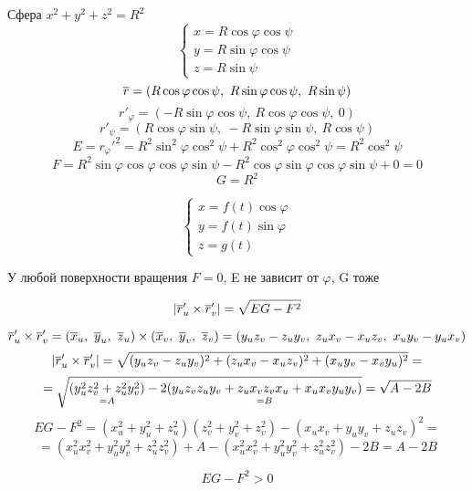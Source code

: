 \documentclass[main]{subfiles}
\begin{document}

	\begin{example}
		Сфера $x^2 + y^2 + z^2 = R^2$
		\[\begin{cases}
		  x = R \cos\varphi \cos\psi\\
		  y = R \sin\varphi \cos\psi\\
		  z = R \sin\psi
		\end{cases}\]
		\[\overline{r} = (R \cos\varphi \cos\psi,\ R\sin\varphi \cos\psi,\ R \sin\psi)\]
		\[r'_{\varphi} = (-R \sin\varphi \cos\psi,\ R\cos\varphi \cos\psi,\ 0)\]
		\[r'_{\psi} = (R \cos\varphi \sin\psi,\ -R\sin\varphi \sin\psi,\ R \cos\psi)\]
		\[E = r_{\varphi}'^2 = R^2 \sin^2 \varphi \cos^2 \psi + R^2 \cos^2 \varphi \cos^2 \psi = R^2 \cos^2 \psi\]
		\[F = R^2 \sin\varphi \cos\varphi\cos\varphi\sin\psi - R^2 \cos\varphi \sin\varphi \cos\varphi \sin\psi + 0 = 0\]
		\[G = R^2\]
	\end{example}

	\begin{Example} 
		\[\begin{cases}
		  x = f(t) \cos\varphi\\
		  y = f(t) \sin\varphi\\
		  z = g(t)
		\end{cases}\]
	\end{Example}

	\begin{upr}
		У любой поверхности вращения $F=0$, E не зависит от $\varphi$, G тоже
	\end{upr}

	\begin{Theorem}
		\[|\overline{r}'_u \times \overline{r}'_v| = \sqrt{EG-F^2}\]
	\end{Theorem}

	\begin{Proof}
		\[\ol{r}_u' \times \ol{r}_v' = (\ol{x}_u,\ \ol{y}_u,\ \ol{z}_u) \times (\ol{x}_v,\ \ol{y}_v,\ \ol{z}_v) = (y_u z_v - z_u y_v,\ z_u x_v - x_u z_v,\ x_u y_v - y_u x_v)\]
		\[|\overline{r}_u' \times \overline{r}_v'| = \sqrt{(y_u z_v - z_u y_v)^2 + (z_u x_v - x_u z_v)^2 + (x_u y_v - x_v y_u)^2} = \]
		\[= \sqrt{\underset{=A}{(y_u^2 z_v^2 + z_u^2 y_v^2)} - 2 \underset{=B}{(y_u z_v z_u y_v + z_u x_v z_v x_u + x_u x_v y_u y_v)}} = \sqrt{A - 2B}\]
		\[EG-F^2 = (x_u^2 + y_u^2 + z_u^2)(z_v^2 + y_v^2 + z_v^2) - (x_u x_v + y_u y_v + z_u z_v)^2 =\]
		\[= (x_u^2 x_v^2 + y_u^2 y_v^2 + z_u^2 z_v^2) + A - (x_u^2 x_v^2 + y_u^2 y_v^2 + z_u^2 z_v^2) - 2B = A - 2B\]
	\end{Proof}

	\begin{Consequence}
		\[EG-F^2 > 0\]
	\end{Consequence}
\end{document}
